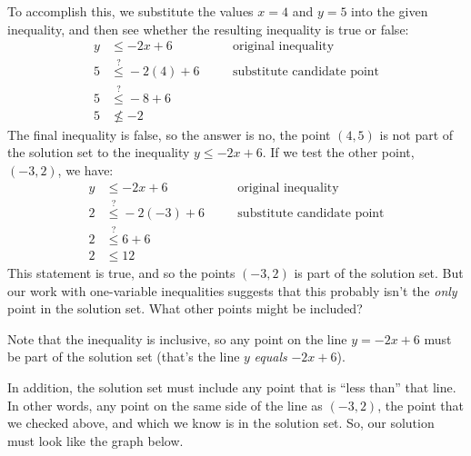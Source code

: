 To accomplish this, we substitute the values $x=4$ and $y=5$ into the given inequality, and then see whether the resulting inequality is true or false:
\[\begin{aligned}
y &\leq -2x+6
&& \quad\text{original inequality}\\
5 &\overset{?}{\leq} -2(4)+6
&& \quad\text{substitute candidate point}\\
5 &\overset{?}{\leq} -8+6
\\
5 &\nleq -2
\end{aligned}\]
The final inequality is false, so the answer is no, the point $(4,5)$ is not part of the solution set to the inequality $y \leq -2x + 6$. If we test the other point, $(-3,2)$, we have:
\[\begin{aligned}
y &\leq -2x+6
&& \quad\text{original inequality}\\
2 &\overset{?}{\leq} -2(-3)+6
&& \quad\text{substitute candidate point}\\
2 &\overset{?}{\leq} 6+6
\\
2 &\leq 12
\end{aligned}\]
This statement is true, and so the points $(-3,2)$ is part of the solution set. But our work with one-variable inequalities suggests that this probably isn't the \textit{only} point in the solution set. What other points might be included?

Note that the inequality is inclusive, so any point on the line $y = -2x + 6$ must be part of the solution set (that's the line $y$ \textit{equals} $-2x + 6$).

In addition, the solution set must include any point that is ``less than'' that line. In other words, any point on the same side of the line as $(-3,2)$, the point that we checked above, and which we know is in the solution set. So, our solution must look like the graph below.
\begin{center}
\end{center}

